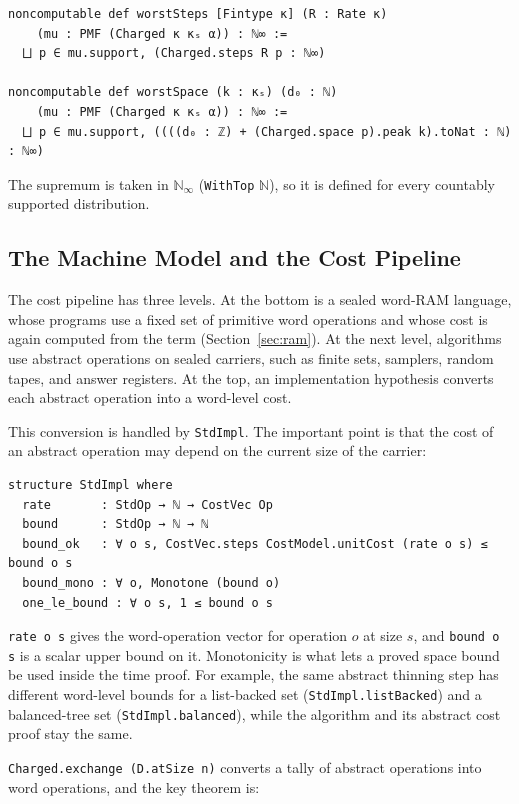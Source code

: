 \documentclass[acmsmall,nonacm]{acmart}
\begin{document}
\begin{lstlisting}
noncomputable def worstSteps [Fintype κ] (R : Rate κ)
    (mu : PMF (Charged κ κₛ α)) : ℕ∞ :=
  ⨆ p ∈ mu.support, (Charged.steps R p : ℕ∞)

noncomputable def worstSpace (k : κₛ) (d₀ : ℕ)
    (mu : PMF (Charged κ κₛ α)) : ℕ∞ :=
  ⨆ p ∈ mu.support, ((((d₀ : ℤ) + (Charged.space p).peak k).toNat : ℕ) : ℕ∞)
\end{lstlisting}

The supremum is taken in $\mathbb{N}_\infty$ (\lstinline{WithTop} $\mathbb{N}$), so it is defined for every countably supported distribution.

\subsection{The Machine Model and the Cost Pipeline}\label{sec:pipeline}

The cost pipeline has three levels.
At the bottom is a sealed word-RAM language, whose programs use a fixed set of primitive word operations and whose cost is again computed from the term (Section~\ref{sec:ram}).
At the next level, algorithms use abstract operations on sealed carriers, such as finite sets, samplers, random tapes, and answer registers.
At the top, an implementation hypothesis converts each abstract operation into a word-level cost.

This conversion is handled by \lstinline{StdImpl}.
The important point is that the cost of an abstract operation may depend on the current size of the carrier:

\begin{lstlisting}
structure StdImpl where
  rate       : StdOp → ℕ → CostVec Op
  bound      : StdOp → ℕ → ℕ
  bound_ok   : ∀ o s, CostVec.steps CostModel.unitCost (rate o s) ≤ bound o s
  bound_mono : ∀ o, Monotone (bound o)
  one_le_bound : ∀ o s, 1 ≤ bound o s
\end{lstlisting}

\lstinline{rate o s} gives the word-operation vector for operation $o$ at size $s$, and \lstinline{bound o s} is a scalar upper bound on it.
Monotonicity is what lets a proved space bound be used inside the time proof.
For example, the same abstract thinning step has different word-level bounds for a list-backed set (\lstinline{StdImpl.listBacked}) and a balanced-tree set (\lstinline{StdImpl.balanced}), while the algorithm and its abstract cost proof stay the same.

\lstinline{Charged.exchange (D.atSize n)} converts a tally of abstract operations into word operations, and the key theorem is:
\end{document}
